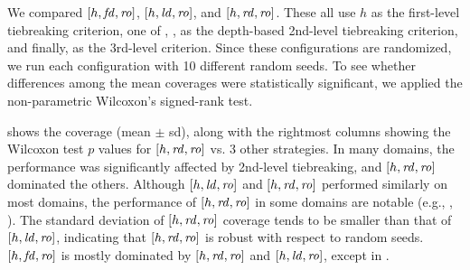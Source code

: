 
We compared 
$[h,{\mbox{\textit{fd}}},{\mbox{\textit{ro}}}]$, $[h,{\mbox{\textit{ld}}},{\mbox{\textit{ro}}}]$, and $[h,{\mbox{\textit{rd}}},{\mbox{\textit{ro}}}]$. These all use 
$h$ as the first-level tiebreaking criterion, one of \fd, \ld, \rd as
the depth-based 2nd-level tiebreaking criterion, and finally,
\ro as the 3rd-level criterion.
Since these configurations are randomized, we run each configuration with 10 different random seeds.
To see whether differences among the mean coverages were statistically significant,
we applied the non-parametric Wilcoxon's signed-rank test.

 shows the coverage (mean $\pm$ sd),
along with the rightmost columns showing the 
Wilcoxon test $p$ values  for  $[h,{\mbox{\textit{rd}}},{\mbox{\textit{ro}}}]$ vs. 3 other strategies.
In many domains,
the performance was significantly affected by 2nd-level tiebreaking, and
$[h,{\mbox{\textit{rd}}},{\mbox{\textit{ro}}}]$ dominated the others. 
Although $[h, {\mbox{\textit{ld}}}, {\mbox{\textit{ro}}}]$ and $[h,{\mbox{\textit{rd}}},{\mbox{\textit{ro}}}]$ performed similarly on most domains, 
the performance of $[h,{\mbox{\textit{rd}}},{\mbox{\textit{ro}}}]$ in some
domains are notable (e.g., , ). 
The standard deviation of $[h,{\mbox{\textit{rd}}},{\mbox{\textit{ro}}}]$ coverage tends to be smaller
than that of $[h,{\mbox{\textit{ld}}},{\mbox{\textit{ro}}}]$, indicating that $[h,{\mbox{\textit{rd}}},{\mbox{\textit{ro}}}]$ is robust with respect to random seeds.
$[h,{\mbox{\textit{fd}}},{\mbox{\textit{ro}}}]$ is mostly dominated by $[h,{\mbox{\textit{rd}}},{\mbox{\textit{ro}}}]$ and $[h,{\mbox{\textit{ld}}},{\mbox{\textit{ro}}}]$,
except in .

